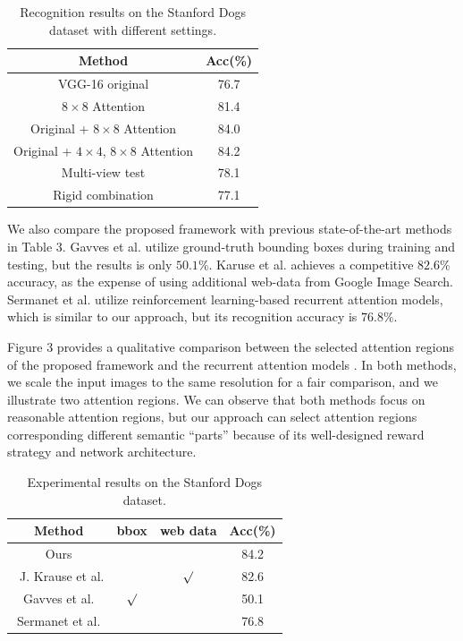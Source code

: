 \documentclass[runningheads]{llncs}
\begin{document}
\begin{table}[htb]
\begin{center}
\begin{tabular}
{c|c}\hline
Method &   Acc(\%) \\\hline\hline
VGG-16 original  & 76.7 \\
$8\times8$ Attention  & 81.4 \\
Original + $8\times8$ Attention & 84.0 \\
Original + $4\times4$, $8\times8$ Attention & 84.2 \\
Multi-view test  & 78.1 \\
Rigid combination & 77.1 \\\hline
\end{tabular}
\caption{Recognition results on the Stanford Dogs dataset with different settings.}
\vspace{-20pt}
\end{center}
\end{table}

We also compare the proposed framework with previous state-of-the-art methods in Table 3.
Gavves et al. \cite{bd13} utilize ground-truth bounding boxes during training and testing, but the results is only $50.1\%$.
Karuse et al. \cite{bd21} achieves a competitive $82.6\%$ accuracy, as the expense of using additional web-data from Google Image Search.
Sermanet et al. \cite{bd3} utilize reinforcement learning-based recurrent attention models, which is similar to our approach, but its recognition accuracy is $76.8\%$.

Figure 3 provides a qualitative comparison between the selected attention regions of the proposed framework and the recurrent attention models \cite{bd3}.
In both methods, we scale the input images to the same resolution for a fair comparison, and we illustrate two attention regions.
We can observe that both methods focus on reasonable attention regions, but our approach can select attention regions corresponding different semantic ``parts'' because of its well-designed reward strategy and network architecture.


\begin{table}[htb]
\begin{center}
\begin{tabular}
{c||c|c|c}\hline
Method &  bbox & web data & Acc(\%) \\\hline\hline
Ours &  & & 84.2 \\\
J. Krause et al. \cite{bd21} &  & $\surd$ & 82.6 \\
Gavves et al. \cite{bd13} & $\surd$ &  & 50.1 \\
Sermanet et al. \cite{bd3}  &  & & 76.8  \\\hline
\end{tabular}
\caption{Experimental results on the Stanford Dogs dataset.}
\vspace{-8pt}
\end{center}
\end{table}
\end{document}
